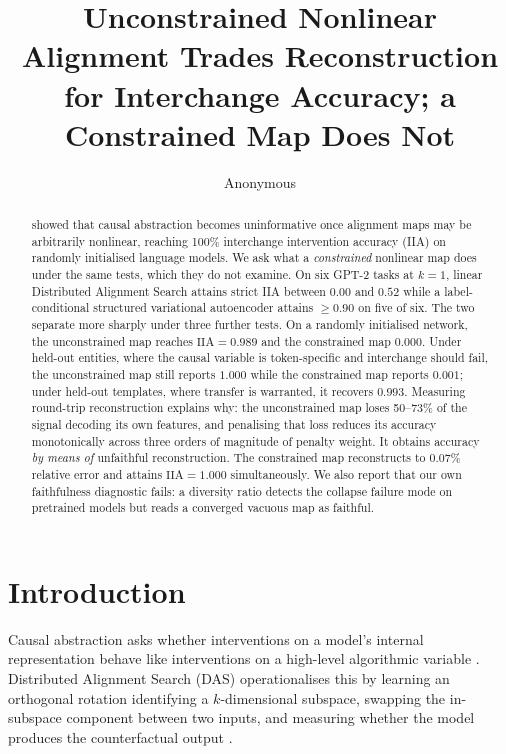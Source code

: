 \documentclass[11pt]{article}
\title{Unconstrained Nonlinear Alignment Trades Reconstruction for Interchange
Accuracy; a Constrained Map Does Not}
\author{Anonymous}
\date{}
\newcommand{\IIA}{\mathrm{IIA}}
\begin{document}
\linenumbers
\maketitle

\begin{abstract}
\citet{sutter2025nonlinear} showed that causal abstraction becomes uninformative
once alignment maps may be arbitrarily nonlinear, reaching 100\% interchange
intervention accuracy (IIA) on randomly initialised language models. We ask what
a \emph{constrained} nonlinear map does under the same tests, which they do not
examine. On six GPT-2 tasks at $k = 1$, linear Distributed Alignment Search
attains strict IIA between $0.00$ and $0.52$ while a label-conditional structured
variational autoencoder attains $\geq 0.90$ on five of six. The two separate more
sharply under three further tests. On a randomly initialised network, the
unconstrained map reaches $\IIA = 0.989$ and the constrained map $0.000$. Under
held-out entities, where the causal variable is token-specific and interchange
should fail, the unconstrained map still reports $1.000$ while the constrained map
reports $0.001$; under held-out templates, where transfer is warranted, it
recovers $0.993$. Measuring round-trip reconstruction explains why: the
unconstrained map loses 50--73\% of the signal decoding its own features, and
penalising that loss reduces its accuracy monotonically across three orders of
magnitude of penalty weight. It obtains accuracy \emph{by means of} unfaithful
reconstruction. The constrained map reconstructs to $0.07\%$ relative error and
attains $\IIA = 1.000$ simultaneously. We also report that our own faithfulness
diagnostic fails: a diversity ratio detects the collapse failure mode on
pretrained models but reads a converged vacuous map as faithful.
\end{abstract}

\section{Introduction}

Causal abstraction asks whether interventions on a model's internal
representation behave like interventions on a high-level algorithmic variable
\citep{geiger2021causal}. Distributed Alignment Search (DAS) operationalises this
by learning an orthogonal rotation identifying a $k$-dimensional subspace,
swapping the in-subspace component between two inputs, and measuring whether the
model produces the counterfactual output \citep{geiger2023finding}.
\end{document}
